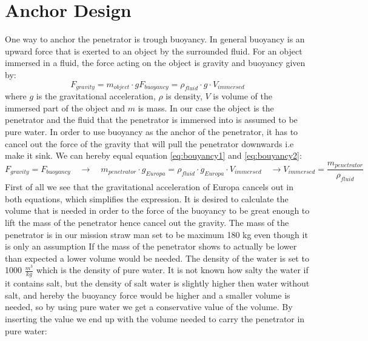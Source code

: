 \section{Anchor Design}
One way to anchor the penetrator is trough buoyancy. In general buoyancy is an upward force that is exerted to an object by the surrounded fluid. For an object immersed in a fluid, the force acting on the object is gravity and buoyancy given by:
\begin{subequations}
\begin{equation}\label{eq:bouyancy1}
F_{gravity} = m_{object} \cdot g
\end{equation}
\begin{equation} \label{eq:bouyancy2}
F_{buoyancy} = \rho_{fluid}\cdot g \cdot V_{immersed} 
\end{equation}
\end{subequations}
where $g$ is the gravitational acceleration, $\rho$ is density, $V$ is volume of the immersed part of the object and $m$ is mass.  In our case the object is the penetrator and the fluid that the penetrator is immersed into is assumed to be pure water. In order to use buoyancy as the anchor of the penetrator, it has to cancel out the force of the gravity that will pull the penetrator downwards i.e make it sink. We can hereby equal equation \ref{eq:bouyancy1} and \ref{eq:bouyancy2}:
\begin{subequations}
\begin{equation*}\label{eq:bou1}
F_{gravity} = F_{buoyancy} \quad \rightarrow \quad m_{penetrator}\cdot g_{Europa} = \rho_{fluid}\cdot g_{Europa} \cdot V_{immersed}   \quad \rightarrow 
\end{equation*}
\begin{equation} \label{eq:bou2}
V_{immersed} = \frac{m_{penetrator}}{\rho_{fluid}}
\end{equation}
\end{subequations}
First of all we see that the gravitational acceleration of Europa cancels out in both equations, which simplifies the expression. It is desired to calculate the volume that is needed in order to the force of the buoyancy to be great enough to lift the mass of the penetrator hence cancel out the gravity. The mass of the penetrator is in our mission straw man set to be maximum 180 kg even though it is only an assumption  If the mass of the penetrator shows to actually be lower than expected a lower volume would be needed. The density of the water is set to 1000 $\frac{m^3}{kg}$ which is the density of pure water. It is not known how salty the water if it contains salt, but the density of salt water is slightly higher then water without salt, and hereby the buoyancy force would be higher and a smaller volume is needed, so by using pure water we get a conservative value of the volume. By inserting the value we end up with the volume needed to carry the penetrator in pure water:

